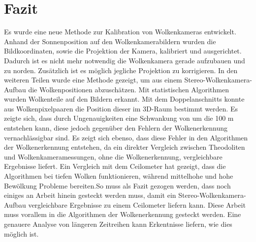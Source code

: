 \documentclass[a4paper,11pt,twoside,german]{article}
\newcommand{\absatz}{\smallbreak}
\newcommand{\literaturverzeichnis}[1]{
    \renewcommand{\harvardand}{und} %
    
    }
\begin{document}


\section{Fazit}
Es wurde eine neue Methode zur Kalibration von Wolkenkameras entwickelt. Anhand
der Sonnenposition auf den Wolkenkamerabildern wurden die Bildkoordinaten, sowie
die Projektion der Kamera, kalibriert und ausgerichtet. Dadurch ist es nicht
mehr notwendig die Wolkenkamera gerade aufzubauen und zu norden. Zusätzlich ist
es möglich jegliche Projektion zu korrigieren. In den weiteren Teilen wurde eine
Methode gezeigt, um aus einem Stereo-Wolkenkamera-Aufbau die Wolkenpositionen
abzuschätzen. Mit statistischen Algorithmen wurden Wolkenteile auf den Bildern
erkannt. Mit dem Doppelanschnitts konnte aus Wolkenpixelpaaren die Position
dieser im 3D-Raum bestimmt werden. Es zeigte sich, dass durch Ungenauigkeiten
eine Schwankung von um die 100 m entstehen kann, diese jedoch gegenüber den
Fehlern der Wolkenerkennung vernachlässigbar sind. Es zeigt sich ebenso, dass
diese Fehler in den Algorithmen der Wolkenerkennung entstehen, da ein direkter
Vergleich zwischen Theodoliten und Wolkenkameramessungen, ohne die
Wolkenerkennung, vergleichbare Ergebnisse liefert. Ein Vergleich mit dem
Ceilometer hat gezeigt, dass die Algorithmen bei tiefen Wolken funktionieren,
während mittelhohe und hohe Bewölkung Probleme bereiten.\absatz So muss als
Fazit gezogen werden, dass noch einiges an Arbeit hinein gesteckt werden muss,
damit ein Stereo-Wolkenkamera-Aufbau vergleichbare Ergebnisse zu einem
Ceilometer liefern kann. Diese Arbeit muss vorallem in die Algorithmen der
Wolkenerkennung gesteckt werden. Eine genauere Analyse von längeren Zeitreihen
kann Erkentnisse liefern, wie dies möglich ist.



\literaturverzeichnis{bibliography} %
\end{document}
